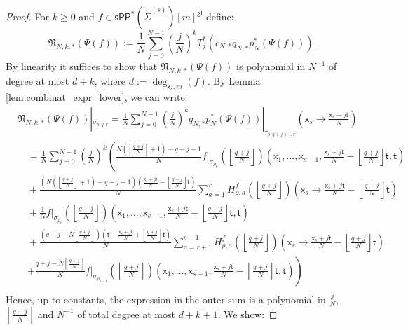 \documentclass[11pt]{article}
\newcommand{\sPP}{\mathsf{sPP}}
\newcommand{\spp}{\sPP}
\theoremstyle{definition}
\begin{document}
\begin{proof}
	For $k\ge 0$ and $f\in \spp^{\ast}(\tilde{\Sigma}^{(s)})[m]^{\mathsf{gl}}$ define:
	$$\mathfrak{N}_{N,k,\ast}(\Psi(f)):=\frac{1}{N}\sum_{j=0}^{N-1}\left(\frac{j}{N}\right)^{k}T_j ^{\ast}(c_{N,\ast}q_{N,\ast}p_N^{\ast}(\Psi(f))).$$
	By linearity it suffices to show that $\mathfrak{N}_{N,k,\ast}(\Psi(f))$ is polynomial in $N^{-1}$ of degree at most $d+k$, where
	$d:=\deg_{\mathsf{x}_s,m}(f)$. By Lemma \ref{lem:combinat_expr_lower}, we can write:
    {\allowdisplaybreaks
	\begin{align*}
		&\mathfrak{N}_{N,k,\ast}(\Psi(f))|_{\sigma_{\rho,q,r}}=\frac{1}{N}\sum_{j=0}^{N-1}\left(\frac{j}{N}\right)^{k}q_{N,\ast}p_N^{\ast}(\Psi(f))|_{\tau_{\rho,q+j+1,r}}\left(\mathsf{x}_s\to \frac{\mathsf{x}_s+j\mathsf{t}}{N}\right)\\
		&\quad=\frac{1}{N}\sum_{j=0}^{N-1}\left(\frac{j}{N}\right)^{k}\left(\frac{N\left(\left\lfloor \frac{q+j}{N}\right\rfloor+1\right)-q-j-1}{N}f|_{\sigma_{\rho_0}}\left(\left\lfloor \frac{q+j}{N}\right\rfloor\right)\left(\mathsf{x}_1,\dots,\mathsf{x}_{s-1},\frac{\mathsf{x}_s+j\mathsf{t}}{N}-\left\lfloor \frac{q+j}{N}\right\rfloor \mathsf{t},\mathsf{t}\right)\right.\\
		&\quad +\frac{\left(N\left(\left\lfloor \frac{q+j}{N}\right\rfloor+1\right)-q-j-1\right)\left(\frac{\mathsf{x}_s+j\mathsf{t}}{N}-\left\lfloor \frac{q+j}{N}\right\rfloor \mathsf{t}\right)}{N}\sum_{a=1}^{r}H_{\rho,a}^f\left(\left\lfloor \frac{q+j}{N}\right\rfloor\right)\left(\mathsf{x}_s\to \frac{\mathsf{x}_s+j\mathsf{t}}{N}-\left\lfloor \frac{q+j}{N}\right\rfloor \mathsf{t}\right)\\
		&\quad+\frac{1}{N}f|_{\sigma_{\rho_r}}\left(\left\lfloor \frac{q+j}{N}\right\rfloor\right)\left(\mathsf{x}_1,\dots,\mathsf{x}_{s-1},\frac{\mathsf{x}_s+j\mathsf{t}}{N}-\left\lfloor \frac{q+j}{N}\right\rfloor \mathsf{t},\mathsf{t}\right)\\
		&\quad+\frac{\left(q+j-N\left\lfloor \frac{q+j}{N}\right\rfloor\right)\left(\mathsf{t}-\frac{\mathsf{x}_s+j\mathsf{t}}{N}+\left\lfloor \frac{q+j}{N}\right\rfloor \mathsf{t}\right)}{N}\sum_{a=r+1}^{s-1}H_{\rho,a}^f\left(\left\lfloor \frac{q+j}{N}\right\rfloor\right)\left(\mathsf{x}_s\to \frac{\mathsf{x}_s+j\mathsf{t}}{N}-\left\lfloor \frac{q+j}{N}\right\rfloor \mathsf{t}\right)\\
		&\quad\left.+\frac{q+j-N\left\lfloor \frac{q+j}{N}\right\rfloor}{N}f|_{\sigma_{\rho_{s-1}}}\left(\left\lfloor \frac{q+j}{N}\right\rfloor\right)\left(\mathsf{x}_1,\dots,\mathsf{x}_{s-1},\frac{\mathsf{x}_s+j\mathsf{t}}{N}-\left\lfloor \frac{q+j}{N}\right\rfloor \mathsf{t},\mathsf{t}\right)\right)\\
	\end{align*}}
	Hence, up to constants, the expression in the outer sum is a polynomial in $\frac{j}{N}$, $\left\lfloor \frac{q+j}{N}\right\rfloor$ and $N^{-1}$ of total degree
	at most $d+k+1$. We show:


\end{proof}
\end{document}
